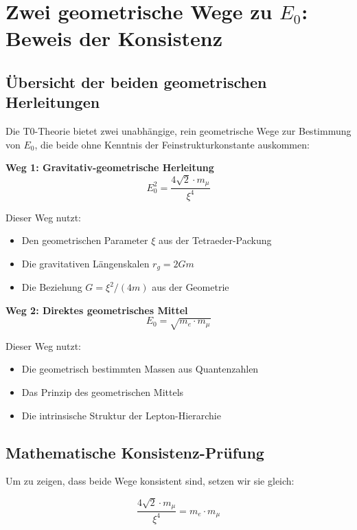 \documentclass[12pt,a4paper]{article}
\theoremstyle{definition}
\begin{document}
	\section{Zwei geometrische Wege zu $E_0$: Beweis der Konsistenz}
	
	\subsection{\"Ubersicht der beiden geometrischen Herleitungen}
	
	Die T0-Theorie bietet zwei unabh\"angige, rein geometrische Wege zur Bestimmung von $E_0$, die beide ohne Kenntnis der Feinstrukturkonstante auskommen:
	
	\textbf{Weg 1: Gravitativ-geometrische Herleitung}
	\begin{equation}
		E_0^2 = \frac{4\sqrt{2} \cdot m_\mu}{\xi^4}
	\end{equation}
	
	Dieser Weg nutzt:
	\begin{itemize}
		\item Den geometrischen Parameter $\xi$ aus der Tetraeder-Packung
		\item Die gravitativen L\"angenskalen $r_g = 2Gm$
		\item Die Beziehung $G = \xi^2/(4m)$ aus der Geometrie
	\end{itemize}
	
	\textbf{Weg 2: Direktes geometrisches Mittel}
	\begin{equation}
		E_0 = \sqrt{m_e \cdot m_\mu}
	\end{equation}
	
	Dieser Weg nutzt:
	\begin{itemize}
		\item Die geometrisch bestimmten Massen aus Quantenzahlen
		\item Das Prinzip des geometrischen Mittels
		\item Die intrinsische Struktur der Lepton-Hierarchie
	\end{itemize}
	
	\subsection{Mathematische Konsistenz-Pr\"ufung}
	
	Um zu zeigen, dass beide Wege konsistent sind, setzen wir sie gleich:
	
	\begin{equation}
		\frac{4\sqrt{2} \cdot m_\mu}{\xi^4} = m_e \cdot m_\mu
	\end{equation}
	
\end{document}
